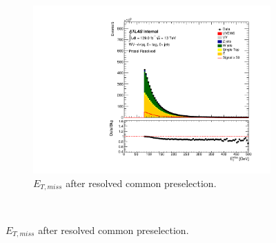 \begin{figure}[ht]
\begin{subfigure}{0.32\textwidth}
            \includegraphics[width=\linewidth]{figures/event_selection/Presel_Resolved_MET.pdf}
            \caption{$E_{T,miss}$ after resolved common preselection.}
        \end{subfigure} \\


\end{figure}
